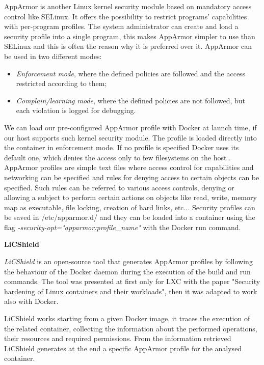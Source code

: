 \documentclass[a4paper,12pt]{article}
\begin{document}
AppArmor is another Linux kernel security module based on mandatory access
control like SELinux. It offers the possibility to restrict programs'
capabilities with per-program profiles. The system administrator can create and
load a security profile into a single program, this makes AppArmor simpler to
use than SELinux and this is often the reason why it is preferred over it.
AppArmor can be used in two different modes:
\begin{itemize}
  \item \textit{Enforcement mode}, where the defined policies are followed and
  the access restricted according to them; 
  \item \textit{Complain/learning mode}, where the defined policies are not
  followed, but each violation is logged for debugging.
\end{itemize}
\par We can load our pre-configured AppArmor profile with Docker at launch time,
if our host supports such kernel security module. The profile is loaded directly
into the container in enforcement mode. If no profile is specified Docker uses
its default one, which denies the access only to few filesystems on the host
\cite{bui_docker_security}. AppArmor profiles are simple text files where access
control for capabilities and networking can be specified and rules for denying
access to certain objects can be specified. Such rules can be referred to
various access controls, denying or allowing a subject to perform certain
actions on objects like read, write, memory map as executable, file locking,
creation of hard links, etc... Security profiles can be saved in
/etc/apparmor.d/ and they can be loaded into a container using the flag
\textit{-security-opt="apparmor:profile\_name"} with the Docker run command. 

\bigbreak\textbf{LiCShield}\bigbreak 

\textit{LiCShield}\cite{licshield} is an open-source tool that generates
AppArmor profiles by following the behaviour of the Docker daemon during the
execution of the build and run commands. The tool was presented at first only
for LXC with the paper "Security hardening of Linux containers and their
workloads"\cite{licshield_paper}, then it was adapted to work also with Docker.
\par LiCShield works starting from a given Docker image, it traces the execution
of the related container, collecting the information about the performed
operations, their resources and required permissions. From the information
retrieved LiCShield generates at the end a specific AppArmor profile for the
analysed container. 
\end{document}
